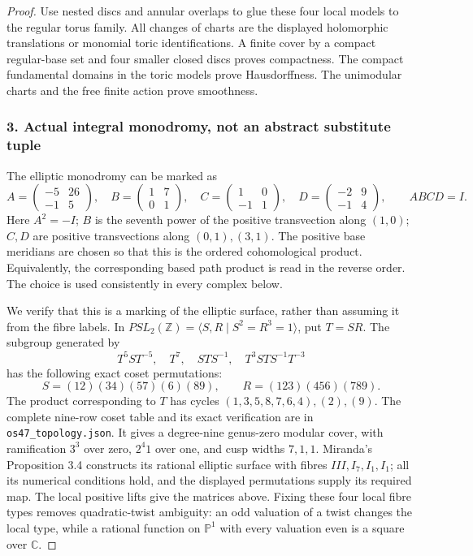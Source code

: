 \begin{proof}
Use nested discs and annular overlaps to glue these four local models to the regular torus family. All changes of charts are the displayed holomorphic translations or monomial toric identifications. A finite cover by a compact regular-base set and four smaller closed discs proves compactness. The compact fundamental domains in the toric models prove Hausdorffness. The unimodular charts and the free finite action prove smoothness.

\subsubsection{3. Actual integral monodromy, not an abstract substitute tuple}\label{actual-integral-monodromy-not-an-abstract-substitute-tuple}

The elliptic monodromy can be marked as \[
 A=\begin{pmatrix}-5&26\\-1&5\end{pmatrix},\quad
 B=\begin{pmatrix}1&7\\0&1\end{pmatrix},\quad
 C=\begin{pmatrix}1&0\\-1&1\end{pmatrix},\quad
 D=\begin{pmatrix}-2&9\\-1&4\end{pmatrix},
 \qquad ABCD=I.
\] Here \(A^2=-I\); \(B\) is the seventh power of the positive transvection along \((1,0)\); \(C,D\) are positive transvections along \((0,1),(3,1)\). The positive base meridians are chosen so that this is the ordered cohomological product. Equivalently, the corresponding based path product is read in the reverse order. The choice is used consistently in every complex below.

We verify that this is a marking of the elliptic surface, rather than assuming it from the fibre labels. In \(PSL_2(\mathbb Z)=\langle S,R\mid S^2=R^3=1\rangle\), put \(T=SR\). The subgroup generated by \[
 T^5ST^{-5},\quad T^7,\quad STS^{-1},\quad T^3STS^{-1}T^{-3}
\] has the following exact coset permutations: \[
 S=(12)(34)(57)(6)(89),\qquad
 R=(123)(456)(789).
\] The product corresponding to \(T\) has cycles \((1,3,5,8,7,6,4),(2),(9)\). The complete nine-row coset table and its exact verification are in \texttt{os47\_topology.json}. It gives a degree-nine genus-zero modular cover, with ramification \(3^3\) over zero, \(2^4 1\) over one, and cusp widths \(7,1,1\). Miranda's Proposition 3.4 constructs its rational elliptic surface with fibres \(III,I_7,I_1,I_1\); all its numerical conditions hold, and the displayed permutations supply its required map. The local positive lifts give the matrices above. Fixing these four local fibre types removes quadratic-twist ambiguity: an odd valuation of a twist changes the local type, while a rational function on \(\mathbb P^1\) with every valuation even is a square over \(\mathbb C\).


\end{proof}
